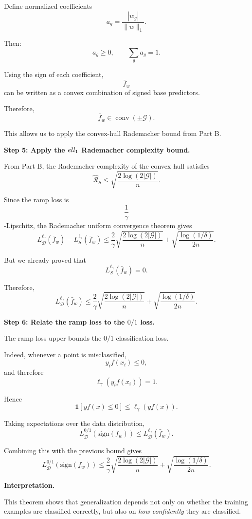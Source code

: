 \documentclass[11pt]{article}
\newcommand{\sign}{\mathrm{sign}}
\newcommand{\ind}{\mathbf{1}}
\begin{document}
\begin{enumerate}
\begin{solutionbox}
Define normalized coefficients
\[
a_g
=
\frac{|w_g|}{\|w\|_1}.
\]

Then:
\[
a_g\ge0,
\qquad
\sum_ga_g=1.
\]

Using the sign of each coefficient,
\[
\bar f_w
\]
can be written as a convex combination of signed base predictors.

Therefore,
\[
\bar f_w
\in
\operatorname{conv}(\pm\mathcal G).
\]

This allows us to apply the convex-hull Rademacher bound from Part B.

\medskip

\textbf{Step 5: Apply the $\\ell_1$ Rademacher complexity bound.}

From Part B, the Rademacher complexity of the convex hull satisfies
\[
\widehat{\mathcal R}_S
\le
\sqrt{
\frac{
2\log(2|\mathcal G|)
}{n}
}.
\]

Since the ramp loss is
\[
\frac1\gamma
\]
-Lipschitz, the Rademacher uniform convergence theorem gives
\[
L_{\mathcal D}^{\ell_\gamma}(\bar f_w)
-
L_S^{\ell_\gamma}(\bar f_w)
\le
\frac{2}{\gamma}
\sqrt{
\frac{
2\log(2|\mathcal G|)
}{n}
}
+
\sqrt{
\frac{
\log(1/\delta)
}{2n}
}.
\]

But we already proved that
\[
L_S^{\ell_\gamma}(\bar f_w)=0.
\]

Therefore,
\[
L_{\mathcal D}^{\ell_\gamma}(\bar f_w)
\le
\frac{2}{\gamma}
\sqrt{
\frac{
2\log(2|\mathcal G|)
}{n}
}
+
\sqrt{
\frac{
\log(1/\delta)
}{2n}
}.
\]

\medskip

\textbf{Step 6: Relate the ramp loss to the $0/1$ loss.}

The ramp loss upper bounds the $0/1$ classification loss.

Indeed, whenever a point is misclassified,
\[
y_if(x_i)\le0,
\]
and therefore
\[
\ell_\gamma(y_if(x_i))=1.
\]

Hence
\[
\ind[yf(x)\le0]
\le
\ell_\gamma(yf(x)).
\]

Taking expectations over the data distribution,
\[
L_{\mathcal D}^{0/1}(\sign(f_w))
\le
L_{\mathcal D}^{\ell_\gamma}(\bar f_w).
\]

Combining this with the previous bound gives
\[
\boxed{
L_{\mathcal D}^{0/1}(\sign(f_w))
\le
\frac{2}{\gamma}
\sqrt{
\frac{
2\log(2|\mathcal G|)
}{n}
}
+
\sqrt{
\frac{
\log(1/\delta)
}{2n}
}.
}
\]

\medskip

\textbf{Interpretation.}

This theorem shows that generalization depends not only on whether the training examples are classified correctly, but also on \emph{how confidently} they are classified.


\end{solutionbox}
\end{enumerate}
\end{document}
